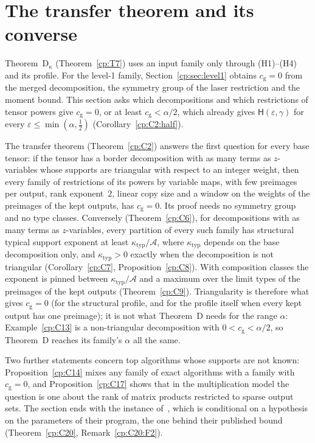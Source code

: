 \documentclass[11pt]{article}
\theoremstyle{definition}
\theoremstyle{remark}
\providecommand{\eps}{\varepsilon}
\newcommand{\Hyp}{\mathsf{H}}                 %
\newcommand{\cg}{c_{\mathrm g}}               %
\newcommand{\Hcond}[1]{\textup{(H#1)}}        %
\newcommand{\ThmD}{Theorem~D}                               %
\newcommand{\ThmDk}{Theorem~D\texorpdfstring{\ensuremath{_\kappa}}{\_kappa}}     %
\newcommand{\Acs}{\mathcal A}                %
\newcommand{\ktyp}{\kappa_{\mathrm{typ}}}    %
\begin{document}
\section{The transfer theorem and its converse}\label{cp:sec:transfer}

\ThmDk{} (Theorem~\ref{cp:T7}) uses an input family only through \Hcond1--\Hcond4{} and its profile. For the level-1 family, Section~\ref{cp:sec:level1} obtains $\cg=0$ from the merged decomposition, the symmetry group of the laser restriction and the moment bound. This section asks which decompositions and which restrictions of tensor powers give $\cg=0$, or at least $\cg<\alpha/2$, which already gives $\Hyp(\eps,\gamma)$ for every $\eps\le\min(\alpha,\frac12)$ (Corollary~\ref{cp:C2:half}).

The transfer theorem (Theorem~\ref{cp:C2}) answers the first question for every base tensor: if the tensor has a border decomposition with as many terms as $z$-variables whose supports are triangular with respect to an integer weight, then every family of restrictions of its powers by variable maps, with few preimages per output, rank exponent~$2$, linear copy size and a window on the weights of the preimages of the kept outputs, has $\cg=0$. Its proof needs no symmetry group and no type classes. Conversely (Theorem~\ref{cp:C6}), for decompositions with as many terms as $z$-variables, every partition of every such family has structural typical support exponent at least $\ktyp/\Acs$, where $\ktyp$ depends on the base decomposition only, and $\ktyp>0$ exactly when the decomposition is not triangular (Corollary~\ref{cp:C7}, Proposition~\ref{cp:C8}). With composition classes the exponent is pinned between $\ktyp/\Acs$ and a maximum over the limit types of the preimages of the kept outputs (Theorem~\ref{cp:C9}). Triangularity is therefore what gives $\cg=0$ (for the structural profile, and for the profile itself when every kept output has one preimage); it is not what \ThmD{} needs for the range $\alpha$: Example~\ref{cp:C13} is a non-triangular decomposition with $0<\cg<\alpha/2$, so \ThmD{} reaches its family's $\alpha$ all the same.

Two further statements concern top algorithms whose supports are not known: Proposition~\ref{cp:C14} mixes any family of exact algorithms with a family with $\cg=0$, and Proposition~\ref{cp:C17} shows that in the multiplication model the question is one about the rank of matrix products restricted to sparse output sets. The section ends with the instance of~\cite{VXXZ24}, which is conditional on a hypothesis on the parameters of their program, the one behind their published bound (Theorem~\ref{cp:C20}, Remark~\ref{cp:C20:F2}).
\end{document}
